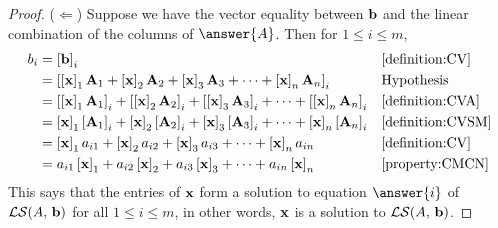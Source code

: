 \documentclass{ximera}
\begin{document}
\begin{theorem}
\begin{proof}
    ($\Leftarrow$) Suppose we have the vector equality between
    $\mathbf{b}$ and the linear combination of the columns of
    $\answer{A}$.  Then for $1\leq i\leq m$,
    \begin{align*}
      b_i
      &=\left\lbrack\mathbf{b}\right\rbrack_{i}&&\ref{definition:CV}\\
      &=\left\lbrack
        \left\lbrack\mathbf{x}\right\rbrack_{1}\mathbf{A}_1+
        \left\lbrack\mathbf{x}\right\rbrack_{2}\mathbf{A}_2+
        \left\lbrack\mathbf{x}\right\rbrack_{3}\mathbf{A}_3+
        \cdots+
        \left\lbrack\mathbf{x}\right\rbrack_{n}\mathbf{A}_n
        \right\rbrack_{i}&&\text{Hypothesis}\\
      &=
        \left\lbrack\left\lbrack\mathbf{x}\right\rbrack_{1}\mathbf{A}_1\right\rbrack_{i}+
        \left\lbrack\left\lbrack\mathbf{x}\right\rbrack_{2}\mathbf{A}_2\right\rbrack_{i}+
        \left\lbrack\left\lbrack\mathbf{x}\right\rbrack_{3}\mathbf{A}_3\right\rbrack_{i}+
        \cdots+
        \left\lbrack\left\lbrack\mathbf{x}\right\rbrack_{n}\mathbf{A}_n\right\rbrack_{i}
                                 &&\ref{definition:CVA}\\
      &=
        \left\lbrack\mathbf{x}\right\rbrack_{1}\left\lbrack\mathbf{A}_1\right\rbrack_{i}+
        \left\lbrack\mathbf{x}\right\rbrack_{2}\left\lbrack\mathbf{A}_2\right\rbrack_{i}+
        \left\lbrack\mathbf{x}\right\rbrack_{3}\left\lbrack\mathbf{A}_3\right\rbrack_{i}+
        \cdots+
        \left\lbrack\mathbf{x}\right\rbrack_{n}\left\lbrack\mathbf{A}_n\right\rbrack_{i}
                                 &&\ref{definition:CVSM}\\
      &=
        \left\lbrack\mathbf{x}\right\rbrack_{1}a_{i1}+
        \left\lbrack\mathbf{x}\right\rbrack_{2}a_{i2}+
        \left\lbrack\mathbf{x}\right\rbrack_{3}a_{i3}+
        \cdots+
        \left\lbrack\mathbf{x}\right\rbrack_{n}a_{in}
                                 &&\ref{definition:CV}\\
      &=
        a_{i1}\left\lbrack\mathbf{x}\right\rbrack_{1}+
        a_{i2}\left\lbrack\mathbf{x}\right\rbrack_{2}+
        a_{i3}\left\lbrack\mathbf{x}\right\rbrack_{3}+
        \cdots+
        a_{in}\left\lbrack\mathbf{x}\right\rbrack_{n}
                                 &&\ref{property:CMCN}
    \end{align*}
    This says that the entries of $\mathbf{x}$ form a solution to
    equation $\answer{i}$ of $\mathcal{LS}\!\left(A,\,\mathbf{b}\right)$ for all
    $1\leq i\leq m$, in other words, $\mathbf{x}$ is a solution to
    $\mathcal{LS}\!\left(A,\,\mathbf{b}\right)$.


\end{proof}
\end{theorem}
\end{document}
